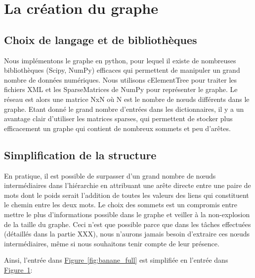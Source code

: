 \section{La création du graphe}

\subsection{Choix de langage et de bibliothèques}
Nous implémentons le graphe en python, pour lequel il existe de nombreuses 
bibliothèques (Scipy, NumPy) efficaces qui permettent de manipuler un grand 
nombre de données numériques. Nous utilisons cElementTree pour traiter les 
fichiers XML et les SparseMatrices de NumPy pour représenter le graphe. Le 
réseau est alors une matrice NxN où N est le nombre de nœuds différents dans le 
graphe. Etant donné le grand nombre d'entrées dans les dictionnaires, il y a un 
avantage clair d'utiliser les matrices sparses, qui permettent de stocker plus 
efficacement un graphe qui contient de nombreux sommets et peu d'arêtes.

\subsection{Simplification de la structure}
En pratique, il est possible de surpasser d'un grand nombre de nœuds 
intermédiaires dans l'hiérarchie en attribuant une arête directe entre une paire 
de mots dont le poids serait l'addition de toutes les valeurs des liens qui 
constituent le chemin entre les deux mots. Le choix des sommets est un compromis 
entre mettre le plus d'informations possible dans le graphe et veiller à la 
non-explosion de la taille du graphe. Ceci n'est que possible parce que dans les 
tâches effectuées (détaillés dans la partie XXX), nous n'aurons jamais besoin 
d'extraire ces nœuds intermédiaires, même si nous souhaitons tenir compte de 
leur présence.

Ainsi, l'entrée dans \hyperref[fig:banane_full]{Figure~\ref*{fig:banane_full}} 
est simplifiée en l'entrée dans 
\hyperref[fig:banane_simple]{Figure~\ref*{fig:banane_simple}}:

\begin{figure}
\centering
\parbox{5cm}{
\def\svgscale{0.5}

\caption{}
\label{fig:banane_full}}
\qquad
\begin{minipage}{5cm}
\def\svgscale{0.5}

\caption{}
\label{fig:banane_simple}
\end{minipage}
\end{figure}

